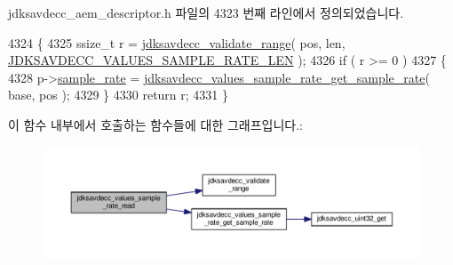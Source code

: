 jdksavdecc\+\_\+aem\+\_\+descriptor.\+h 파일의 4323 번째 라인에서 정의되었습니다.


\begin{DoxyCode}
4324 \{
4325     ssize\_t r = \hyperlink{group__util_ga9c02bdfe76c69163647c3196db7a73a1}{jdksavdecc\_validate\_range}( pos, len, 
      \hyperlink{group__values__sample__rate_gaad452561921ec551b005ee9df89ed3b0}{JDKSAVDECC\_VALUES\_SAMPLE\_RATE\_LEN} );
4326     \textcolor{keywordflow}{if} ( r >= 0 )
4327     \{
4328         p->\hyperlink{structjdksavdecc__values__sample__rate_a2fba55d9442e7dba4623825cd737e520}{sample\_rate} = 
      \hyperlink{group__values__sample__rate_ga5a6516a3d0a0d2b8c1f6f00f18c1d732}{jdksavdecc\_values\_sample\_rate\_get\_sample\_rate}( base, pos );
4329     \}
4330     \textcolor{keywordflow}{return} r;
4331 \}
\end{DoxyCode}


이 함수 내부에서 호출하는 함수들에 대한 그래프입니다.\+:
\nopagebreak
\begin{figure}[H]
\begin{center}
\leavevmode
\includegraphics[width=350pt]{group__values__sample__rate_ga264ae4d66dbc05c8668bda25c763af5f_cgraph}
\end{center}
\end{figure}


